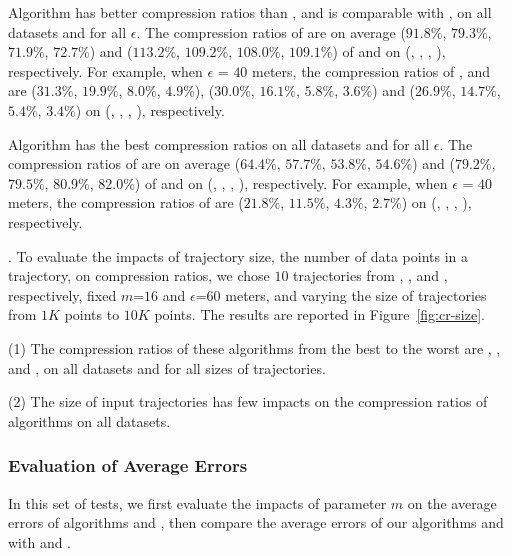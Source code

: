  Algorithm \cist has better compression ratios than \squishe, and is {comparable} with \dps, on all datasets and for all $\epsilon$.
The compression ratios of \cist are on average ($91.8\%$, $79.3\%$, $71.9\%$, {$72.7\%$}) and ($113.2\%$, $109.2\%$, $108.0\%$, $109.1\%$) of \squishe and \dps on (\truck, \sercar, \geolife, \pricar), respectively.
For example, when $\epsilon$ = $40$ meters, the compression ratios of \squishe, \cist and \dps are ($31.3\%$, $19.9\%$, $8.0\%$, $4.9\%$), ($30.0\%$, $16.1\%$, $5.8\%$, $3.6\%$) and ($26.9\%$, $14.7\%$, $5.4\%$, $3.4\%$) on (\truck, \sercar, \geolife, \pricar), respectively.

 Algorithm \cista has {the best} compression ratios on all datasets and for all $\epsilon$.
The compression ratios of \cista are on average ($64.4\%$, $57.7\%$, $53.8\%$, {$54.6\%$}) and ($79.2\%$, $79.5\%$, $80.9\%$, $82.0\%$) of \squishe and \dps on (\truck, \sercar, \geolife, \pricar), respectively.
For example, when $\epsilon$ = $40$ meters, the compression ratios of \cista are ($21.8\%$, $11.5\%$, $4.3\%$, $2.7\%$) on (\truck, \sercar, \geolife, \pricar), respectively.


.
To evaluate the impacts of trajectory size, \ie the number of data points in a trajectory, on compression ratios,
we chose {$10$} trajectories from \truck, \sercar, \geolife and \pricar, respectively,
fixed {$m$=$16$} and $\epsilon$=$60$ meters, and varying the size  of trajectories from $1K$ points to $10K$ points.
%
The results are reported in Figure~\ref{fig:cr-size}.

\ni(1) The compression ratios of these algorithms from the best to the worst are \cista, \dps, \cist and \squishe, on all datasets and for all sizes of trajectories. %

\ni(2) The size of input trajectories has few impacts on the compression ratios of \lsa algorithms on all datasets.





\subsubsection{Evaluation of Average Errors}
In this set of tests, we first evaluate the impacts of parameter $m$ on the average errors of algorithms \cist and \cista, then compare the average errors of our algorithms \cist and \cista with \dps and \squishe.

